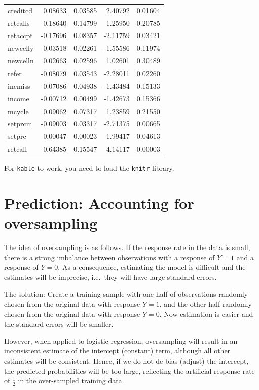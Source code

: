 \documentclass[
]{article}
\begin{document}
\begin{longtable}[]{@{}lrrrr@{}}
creditcd & 0.08633 & 0.03585 & 2.40792 & 0.01604 \\
retcalls & 0.18640 & 0.14799 & 1.25950 & 0.20785 \\
retaccpt & -0.17696 & 0.08357 & -2.11759 & 0.03421 \\
newcelly & -0.03518 & 0.02261 & -1.55586 & 0.11974 \\
newcelln & 0.02663 & 0.02596 & 1.02601 & 0.30489 \\
refer & -0.08079 & 0.03543 & -2.28011 & 0.02260 \\
incmiss & -0.07086 & 0.04938 & -1.43484 & 0.15133 \\
income & -0.00712 & 0.00499 & -1.42673 & 0.15366 \\
mcycle & 0.09062 & 0.07317 & 1.23859 & 0.21550 \\
setprcm & -0.09003 & 0.03317 & -2.71375 & 0.00665 \\
setprc & 0.00047 & 0.00023 & 1.99417 & 0.04613 \\
retcall & 0.64385 & 0.15547 & 4.14117 & 0.00003 \\
\end{longtable}

For \texttt{kable} to work, you need to load the \texttt{knitr} library.

\newpage

\section{Prediction: Accounting for
oversampling}\label{prediction-accounting-for-oversampling}

The idea of oversampling is as follows. If the response rate in the data
is small, there is a strong imbalance between observations with a
response of \(Y=1\) and a response of \(Y=0\). As a consequence,
estimating the model is difficult and the estimates will be imprecise,
i.e.~they will have large standard errors.

The solution: Create a training sample with one half of observations
randomly chosen from the original data with response \(Y=1\), and the
other half randomly chosen from the original data with response \(Y=0\).
Now estimation is easier and the standard errors will be smaller.

However, when applied to logistic regression, oversampling will result
in an inconsistent estimate of the intercept (constant) term, although
all other estimates will be consistent. Hence, if we do not de-bias
(adjust) the intercept, the predicted probabilities will be too large,
reflecting the artificial response rate of \(\frac{1}{2}\) in the
over-sampled training data.
\end{document}
